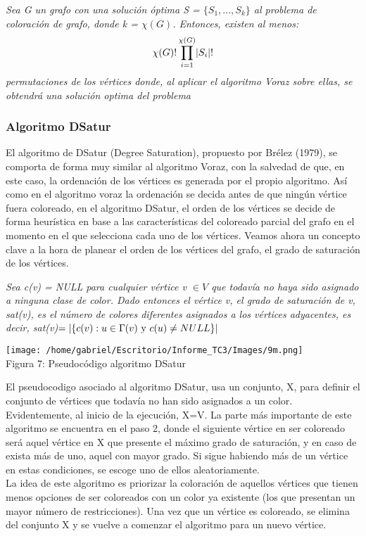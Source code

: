 \documentclass[12pt]{report}
\begin{document}
\begin{tm}
\textsl{Sea G un grafo con una solución óptima S = $\{S_1,...,S_k\}$ al problema de coloración de grafo, donde k = $\chi(G)$. Entonces, existen al menos:}
\begin{equation}
\chi(G)!\prod_{i=1}^{\chi(G)} \lvert S_i\rvert! 
\end{equation}
\textsl{permutaciones de los vértices donde, al aplicar el algoritmo Voraz sobre ellas, se obtendrá una solución optima del problema}
\end{tm}

\subsubsection{Algoritmo DSatur}
El algoritmo de DSatur (Degree Saturation), propuesto por Brélez (1979), se comporta de forma muy similar al algoritmo Voraz, con la salvedad de que, en este caso, la ordenación de los vértices es generada por el propio algoritmo. Así como en el algoritmo voraz la ordenación se decida antes de que ningún vértice fuera coloreado, en el algoritmo DSatur, el orden de los vértices se decide de forma heurística en base a las características del coloreado parcial del grafo en el momento en el que selecciona cada uno de los vértices. Veamos ahora un concepto clave a la hora de planear el orden de los vértices del grafo, el grado de saturación de los vértices.\\
\begin{thm}
\textsl{Sea c(v) = NULL para cualquier vértice v $\in V$ que todavía no haya sido asignado a ninguna clase de color. Dado entonces el vértice v, el grado de saturación de v, sat(v), es el número de colores diferentes asignados a los vértices adyacentes, es decir, sat(v)$=\abs{\{c(v):u \in \Gamma(v)$ y $c(u) \not =  NULL \}}$}
\end{thm}
\begin{center}
\texttt{[image: /home/gabriel/Escritorio/Informe\_TC3/Images/9m.png]}\\
Figura 7: Pseudocódigo algoritmo DSatur
\end{center}
El pseudocodigo asociado al algoritmo DSatur, usa un conjunto, X, para definir el conjunto de vértices que todavía no han sido asignados a un color. Evidentemente, al inicio de la ejecución, X=V. La parte más importante de este algoritmo se encuentra en el paso 2, donde el siguiente vértice en ser coloreado será aquel vértice en X que presente el máximo grado de saturación, y en caso de exista más de uno, aquel con mayor grado. Si sigue habiendo más de un vértice en estas condiciones, se escoge uno de ellos aleatoriamente.\\
La idea de este algoritmo es priorizar la coloración de aquellos vértices que tienen menos opciones de ser coloreados con un color ya existente (los que presentan un mayor número de restricciones). Una vez que un vértice es coloreado, se elimina del conjunto X y se vuelve a comenzar el algoritmo para un nuevo vértice.\\
\end{document}
